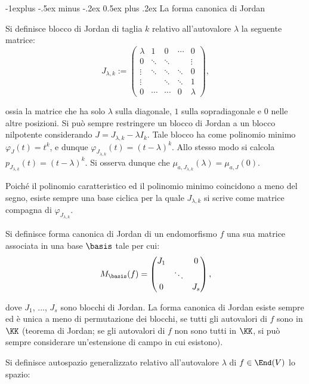 \documentclass[10pt,landscape]{article}
\makeatletter
\renewcommand{\subsection}{\@startsection{subsection}{2}{0mm}%
	{-1explus -.5ex minus -.2ex}%
	{0.5ex plus .2ex}%
	{\normalfont\normalsize\bfseries}}
\makeatother
\begin{document}
\begin{multicols}{3}
		\subsection{La forma canonica di Jordan}
		
		Si definisce blocco di Jordan di taglia $k$ relativo
		all'autovalore $\lambda$ la seguente matrice:
		\[J_{\lambda, k} :=\begin{pmatrix}
			\lambda&1&0&\cdots&0         \\                       
			0&\ddots&\ddots&&\vdots      \\
			\vdots&\ddots&\ddots&\ddots&0\\
			\vdots&&\ddots&\ddots&1      \\
			0&\cdots&\cdots&0&\lambda    
		\end{pmatrix},\]
		
		ossia la matrice che ha solo $\lambda$ sulla diagonale, $1$ sulla
		sopradiagonale e $0$ nelle altre posizioni. Si può
		sempre restringere un blocco di Jordan a un blocco nilpotente
		considerando $J = J_{\lambda, k} - \lambda I_k$. Tale blocco
		ha come polinomio minimo $\varphi_J(t) = t^k$, e dunque
		$\varphi_{J_{\lambda, k}}(t) = (t-\lambda)^k$. Allo stesso
		modo si calcola $p_{J_{\lambda, k}}(t) = (t-\lambda)^k$. Si osserva dunque
		che $\mu_{a, J_{\lambda, k}}(\lambda) = \mu_{a, J}(0)$.
		
		Poiché il polinomio caratteristico ed il polinomio minimo coincidono a meno
		del segno, esiste sempre una base ciclica per la quale $J_{\lambda, k}$
		si scrive come matrice compagna di $\varphi_{J_{\lambda, k}}$.
		
		Si definisce forma canonica di Jordan di un endomorfismo $f$
		una sua matrice associata in una base $\basis$ tale per cui:
		\[M_\basis(f) = \begin{pmatrix}
			J_1 &          & 0   \\
			& \ddots &     \\ 
			0 &          & J_s \end{pmatrix}, \]

		dove $J_1$, ..., $J_s$ sono blocchi di Jordan. La forma canonica
		di Jordan esiste sempre ed è unica a meno di permutazione dei blocchi,
		se tutti gli autovalori di $f$ sono in $\KK$ (teorema di Jordan; se
		gli autovalori di $f$ non sono tutti in $\KK$, si può sempre considerare
		un'estensione di campo in cui esistono).
		
		Si definisce autospazio generalizzato relativo all'autovalore $\lambda$ di
		$f \in \End(V)$ lo spazio:
	

\end{multicols}
\end{document}
